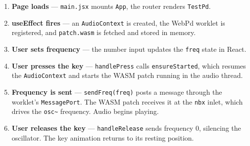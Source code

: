 \documentclass[12pt,a4paper]{article}
\begin{document}
\begin{enumerate}
  \item \textbf{Page loads} — \texttt{main.jsx} mounts \texttt{App}, the router renders \texttt{TestPd}.
  \item \textbf{useEffect fires} — an \texttt{AudioContext} is created, the WebPd worklet is registered, and \texttt{patch.wasm} is fetched and stored in memory.
  \item \textbf{User sets frequency} — the number input updates the \texttt{freq} state in React.
  \item \textbf{User presses the key} — \texttt{handlePress} calls \texttt{ensureStarted}, which resumes the \texttt{AudioContext} and starts the WASM patch running in the audio thread.
  \item \textbf{Frequency is sent} — \texttt{sendFreq(freq)} posts a message through the worklet's \texttt{MessagePort}. The WASM patch receives it at the \texttt{nbx} inlet, which drives the \texttt{osc\textasciitilde} frequency. Audio begins playing.
  \item \textbf{User releases the key} — \texttt{handleRelease} sends frequency 0, silencing the oscillator. The key animation returns to its resting position.
\end{enumerate}
\end{document}
